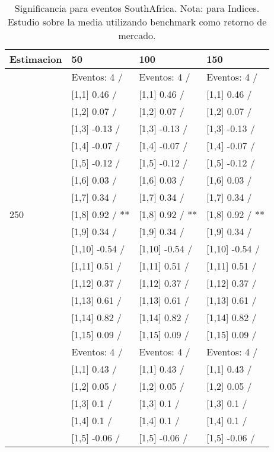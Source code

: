 \begin{table}

\caption{Significancia para eventos SouthAfrica. Nota: para Indices. Estudio sobre la media utilizando benchmark como retorno de mercado.}
\centering
\begin{tabular}[t]{llll}
\toprule
Estimacion & 50 & 100 & 150\\
\midrule
 & Eventos:  4 / & Eventos:  4 / & Eventos:  4 /\\
 & {}[1,1] 0.46  / & {}[1,1] 0.46  / & {}[1,1] 0.46  /\\
 & {}[1,2] 0.07  / & {}[1,2] 0.07  / & {}[1,2] 0.07  /\\
 & {}[1,3] -0.13  / & {}[1,3] -0.13  / & {}[1,3] -0.13  /\\
 & {}[1,4] -0.07  / & {}[1,4] -0.07  / & {}[1,4] -0.07  /\\
\addlinespace
 & {}[1,5] -0.12  / & {}[1,5] -0.12  / & {}[1,5] -0.12  /\\
 & {}[1,6] 0.03  / & {}[1,6] 0.03  / & {}[1,6] 0.03  /\\
 & {}[1,7] 0.34  / & {}[1,7] 0.34  / & {}[1,7] 0.34  /\\
250 & {}[1,8] 0.92  / ** & {}[1,8] 0.92  / ** & {}[1,8] 0.92  / **\\
 & {}[1,9] 0.34  / & {}[1,9] 0.34  / & {}[1,9] 0.34  /\\
\addlinespace
 & {}[1,10] -0.54  / & {}[1,10] -0.54  / & {}[1,10] -0.54  /\\
 & {}[1,11] 0.51  / & {}[1,11] 0.51  / & {}[1,11] 0.51  /\\
 & {}[1,12] 0.37  / & {}[1,12] 0.37  / & {}[1,12] 0.37  /\\
 & {}[1,13] 0.61  / & {}[1,13] 0.61  / & {}[1,13] 0.61  /\\
 & {}[1,14] 0.82  / & {}[1,14] 0.82  / & {}[1,14] 0.82  /\\
\addlinespace
 & {}[1,15] 0.09  / & {}[1,15] 0.09  / & {}[1,15] 0.09  /\\
 & Eventos:  4 / & Eventos:  4 / & Eventos:  4 /\\
 & {}[1,1] 0.43  / & {}[1,1] 0.43  / & {}[1,1] 0.43  /\\
 & {}[1,2] 0.05  / & {}[1,2] 0.05  / & {}[1,2] 0.05  /\\
 & {}[1,3] 0.1  / & {}[1,3] 0.1  / & {}[1,3] 0.1  /\\
\addlinespace
 & {}[1,4] 0.1  / & {}[1,4] 0.1  / & {}[1,4] 0.1  /\\
 & {}[1,5] -0.06  / & {}[1,5] -0.06  / & {}[1,5] -0.06  /\\

\end{tabular}
\end{table}
